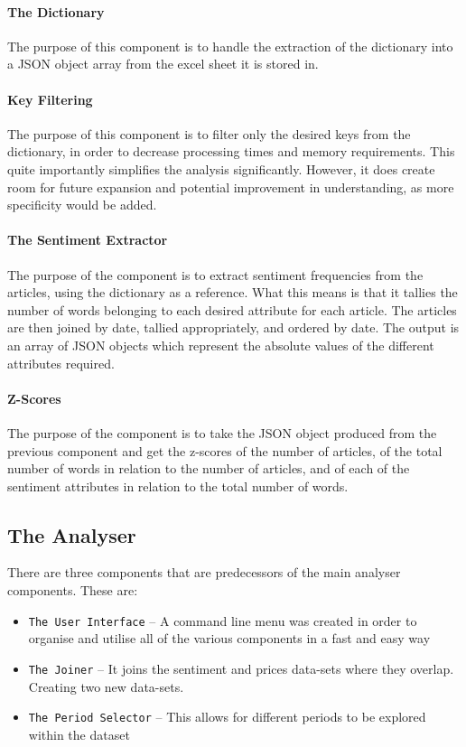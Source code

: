 \paragraph{The Dictionary}

The purpose of this component is to handle the extraction of the dictionary into a JSON object array from the excel sheet it is stored in.

\paragraph{Key Filtering}

The purpose of this component is to filter only the desired keys from the dictionary, in order to decrease processing times and memory requirements. This quite importantly simplifies the analysis significantly. However, it does create room for future expansion and potential improvement in understanding, as more specificity would be added.

\paragraph{The Sentiment Extractor}

The purpose of the component is to extract sentiment frequencies from the articles, using the dictionary as a reference. What this means is that it tallies the number of words belonging to each desired attribute for each article. The articles are then joined by date, tallied appropriately, and ordered by date. The output is an array of JSON objects which represent the absolute values of the different attributes required.

\paragraph{Z-Scores}

The purpose of the component is to take the JSON object produced from the previous component and get the z-scores of the number of articles, of the total number of words in relation to the number of articles, and of each of the sentiment attributes in relation to the total number of words.

\subsection{The Analyser}

There are three components that are predecessors of the main analyser components. These are:
\begin{itemize}
    \item \texttt{The User Interface} -- A command line menu was created in order to organise and utilise all of the various components in a fast and easy way
    \item \texttt{The Joiner} -- It joins the sentiment and prices data-sets where they overlap. Creating two new data-sets.
    \item \texttt{The Period Selector} -- This allows for different periods to be explored within the dataset
\end{itemize}


